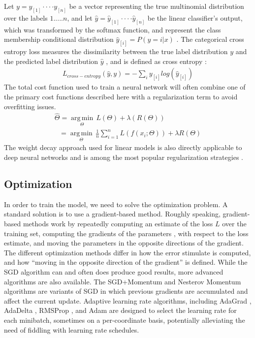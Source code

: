 \documentclass{article}
\begin{document}
Let $y=y_{[1]}\cdot\cdot\cdot\cdot y_{[n]}$ be a vector representing the true multinomial distribution over the labels $1.....n$, and let $\hat y= \hat y_{[1]}\cdot \cdot\cdot\cdot \hat y_{[n]}$ be the linear classifier’s output, which was transformed by the softmax function, and represent the class membership conditional distribution $\hat y_{[i]}=P(y=i|x)$ . The categorical cross entropy loss measures the dissimilarity between the true label distribution $y$ and the predicted label distribution $\hat y$ , and is defined as cross entropy \citep{DBLP:journals/corr/abs-1909-12830}:
\begin{align}
	L_{cross-entropy}(\hat y,y)=-\sum_{i} {y_{[i]}log(\hat y_{[i]})}
\end{align}
The total cost function used to train a neural network will often combine one of the primary cost functions described here with a regularization term to avoid overfitting issues.
\begin{align}
	\hat\Theta={\underset {\Theta}{\operatorname {arg\,min} }}\,L(\Theta)+\lambda (R(\Theta))\\ \ \ \ ={\underset {\Theta}{\operatorname {arg\,min} }}\,\frac{1}{n}\sum_{i=1}^{n}L(f(x_i;\Theta))+\lambda R(\Theta)
\end{align}
The weight decay approach \citep{DBLP:journals/corr/abs-1907-08931} used for linear models is also directly applicable to deep neural networks and is among the most popular regularization strategies \citep{DBLP:journals/corr/abs-1712-04711}.
\subsection{Optimization}
In order to train the model, we need to solve the optimization problem. A standard solution is to use a gradient-based method. Roughly speaking, gradient-based methods work by repeatedly computing an estimate of the loss $L$ over the training set, computing the gradients of the parameters ‚ with respect to the loss estimate, and moving the parameters in the opposite directions of the gradient. The different optimization methods differ in how the error stimulate is computed, and how “moving in the opposite direction of the gradient” is defined.
While the SGD algorithm can and often does produce good results, more advanced algorithms are also available. The SGD+Momentum \citep{DBLP:journals/corr/abs-1907-07063} and Nesterov Momentum algorithms \citep{DBLP:journals/corr/BotevLB16} are variants of SGD in which previous gradients are accumulated and affect the current update. Adaptive learning rate algorithms, including AdaGrad \citep{DBLP:journals/corr/abs-1806-01811}, AdaDelta \citep{DBLP:journals/corr/abs-1212-5701}, RMSProp \citep{DBLP:journals/corr/Ruder16}, and Adam are designed to select the learning rate for each minibatch, sometimes on a per-coordinate basis, potentially alleviating the need of fiddling with learning rate schedules.
\end{document}
